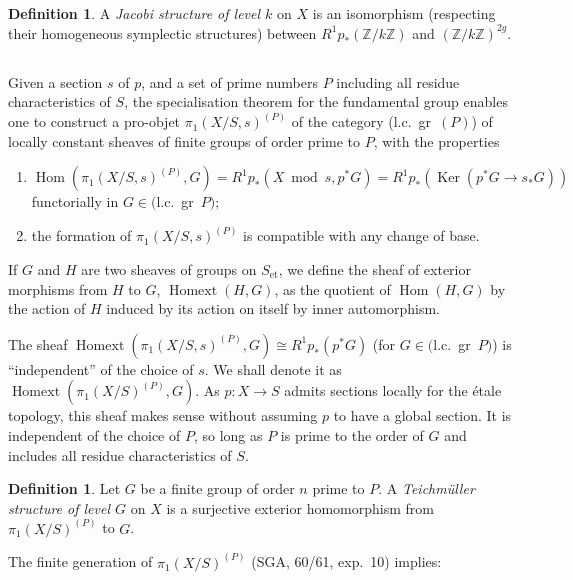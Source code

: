 \documentclass[10pt]{amsart}
\theoremstyle{plain}
\theoremstyle{definition}
\newtheorem{definition}[theorem]{Definition}
\DeclareMathOperator{\Hom}{Hom}
\DeclareMathOperator{\Ker}{Ker}
\DeclareMathOperator{\et}{et}
\DeclareMathOperator{\Homext}{Homext}
\begin{document}
\begin{definition}\label{def:5.4}
A \emph{Jacobi structure of level $k$} on $X$ is an isomorphism (respecting their homogeneous symplectic structures) between $R^1 p_*(\mathbb{Z}/k\mathbb{Z})$ and $(\mathbb{Z}/k\mathbb{Z})^{2g}$.
\end{definition}

\subsection*{}

Given a section $s$ of $p$, and a set of prime numbers $P$ including all residue characteristics of $S$, the specialisation theorem for the fundamental group enables one to construct a pro-objet $\pi_1(X/S, s)^{(P)}$ of the category (l.c.~gr~$(P)$) of locally constant sheaves of finite groups of order prime to $P$, with the properties
\begin{enumerate}
\item[(i)] $\Hom(\pi_1(X/S, s)^{(P)}, G) = R^1 p_*(X \bmod s, p^* G) = R^1 p_*(\Ker(p^* G \to s_* G))$ functorially in $G \in ($l.c.~gr~$P)$;
\item[(ii)] the formation of $\pi_1(X/S, s)^{(P)}$ is compatible with any change of base.
\end{enumerate}

If $G$ and $H$ are two sheaves of groups on $S_{\et}$, we define the sheaf of exterior morphisms from $H$ to $G$, $\Homext(H, G)$, as the quotient of $\Hom(H, G)$ by the action of $H$ induced by its action on itself by inner automorphism.

The sheaf $\Homext(\pi_1(X/S, s)^{(P)}, G) \cong R^1 p_*(p^* G)$ (for $G \in ($l.c.~gr~$P)$) is ``independent'' of the choice of $s$. We shall denote it as $\Homext(\pi_1(X/S)^{(P)}, G)$. As $p: X \to S$ admits sections locally for the \'etale topology, this sheaf makes sense without assuming $p$ to have a global section. It is independent of the choice of $P$, so long as $P$ is prime to the order of $G$ and includes all residue characteristics of $S$.

\begin{definition}\label{def:5.6}
Let $G$ be a finite group of order $n$ prime to $P$. A \emph{Teichm\"uller structure of level $G$} on $X$ is a surjective exterior homomorphism from $\pi_1(X/S)^{(P)}$ to $G$.
\end{definition}

The finite generation of $\pi_1(X/S)^{(P)}$ (SGA, 60/61, exp.~10) implies:
\end{document}
